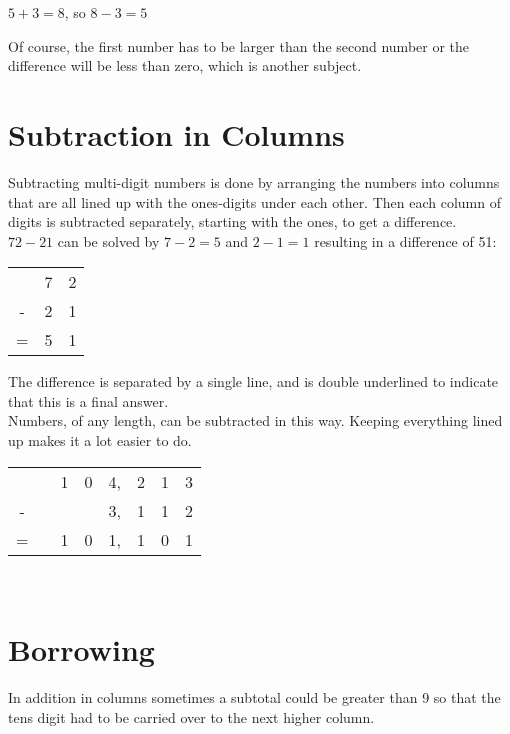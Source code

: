 \documentclass{article}
\begin{document}
\begin{center}
$5 + 3 = 8$, so $8 - 3 = 5$
\end{center}

Of course, the first number has to be larger than the second number or the difference will be less than zero, which is another subject.

\pagebreak

\section{Subtraction in Columns}
Subtracting multi-digit numbers is done by arranging the numbers into columns that are all lined up with the ones-digits under each other. Then each column of digits is subtracted separately, starting with the ones, to get a difference.\\

$72 - 21$ can be solved by $7 - 2 = 5$ and $2 - 1 = 1$ resulting in a difference of 51:

\begin{center}
\begin{tabular}{c@{\,}c@{\,}c@{\,}}
 &7&2\\
-&2&1\\
\hline
=&5&1\\
\hline
\hline
\end{tabular}
\end{center}

\vspace{14pt}
The difference is separated by a single line, and is double underlined to indicate that this is a final answer.\\

Numbers, of any length, can be subtracted in this way. Keeping everything lined up  makes it a lot easier to do.

\begin{center}
\begin{tabular}{c@{\,}c@{\,}c@{\,}c@{\,}c@{\,}c@{\,}c@{\,}c@{\,}}
  & &1&0&4,&2&1&3\\
 -& & & &3,&1&1&2\\
\hline
= & &1&0&1,&1&0&1\\
\hline
\hline
\end{tabular}\\
\end{center}

\section{Borrowing}
In addition in columns sometimes a subtotal could be greater than 9 so that the tens digit had to be carried over to the next higher column.\\
\end{document}
